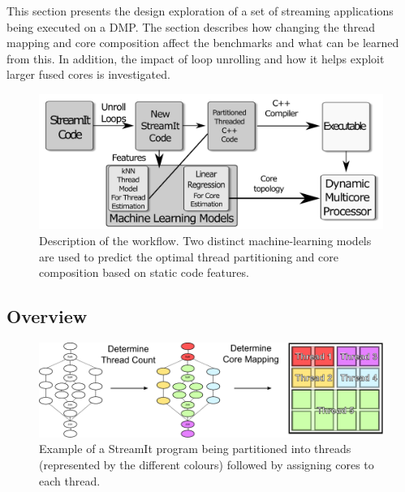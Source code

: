 
This section presents the design exploration of a set of streaming applications being executed on a DMP.
The section describes how changing the thread mapping and core composition affect the benchmarks and what can be learned from this.
In addition, the impact of loop unrolling and how it helps exploit larger fused cores is investigated.


\begin{figure}[t]
    \centering
    \includegraphics[width=1\textwidth]{streamit-paper/graphics/explanation3.pdf}
    \caption{Description of the workflow.
    Two distinct machine-learning models are used to predict the optimal thread partitioning and core composition based on static code features.}
    \label{fig:overview}
\end{figure}

\subsection{Overview}

\begin{figure}[t]
    \centering
    \includegraphics[width=1\textwidth]{streamit-paper/graphics/examplestrem.pdf}
    \caption{Example of a StreamIt program being partitioned into threads (represented by the different colours) followed by assigning cores to each thread.}
    \label{fig:examplestream}
\end{figure}

